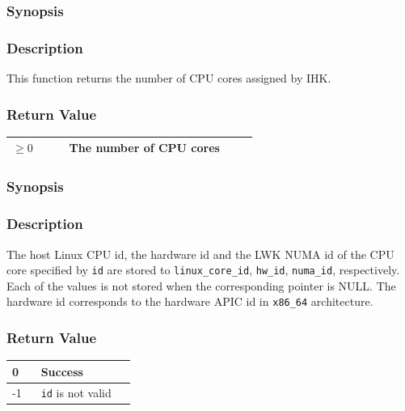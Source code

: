 \documentclass[twoside,11pt,fleqn]{book}
\begin{document}
\subsubsection{}
\subsubsection*{Synopsis}{\quad}
\subsubsection*{Description}{\quad}
This function returns the number of CPU cores assigned by IHK.

\subsubsection*{Return Value}{\quad}
\begin{table}[!h]
\footnotesize
\begin{tabular}{|p{0.20\linewidth}|p{0.66\linewidth}|} \hline
$\ge 0$&The number of CPU cores\\ \hline
\end{tabular}
\vspace{-0em}
\end{table}
\FloatBarrier

\subsubsection{}
\subsubsection*{Synopsis}{\quad}

\subsubsection*{Description}{\quad}
The host Linux CPU id, the hardware id and the LWK NUMA id of the CPU core specified by \texttt{id} are stored to \texttt{linux\_core\_id}, \texttt{hw\_id}, \texttt{numa\_id}, respectively. Each of the values is not stored when the corresponding pointer is NULL. The hardware id corresponds to the hardware APIC id in \texttt{x86\_64} architecture.

\subsubsection*{Return Value}{\quad}
\begin{table}[!h]
\footnotesize
\begin{tabular}{|p{0.20\linewidth}|p{0.66\linewidth}|} \hline
0&Success\\ \hline
-1&\texttt{id} is not valid\\ \hline
\end{tabular}
\vspace{-0em}
\end{table}
\FloatBarrier
\end{document}

